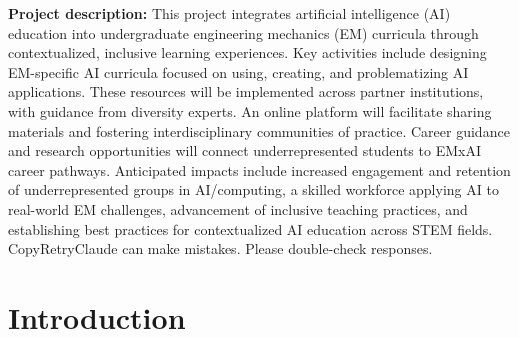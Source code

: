 \documentclass[11pt]{article}
\begin{document}
%
%
\pagestyle{plain} %
%
%
\setlength{\baselineskip}{12.6pt} %
\setlength{\normalbaselineskip}{12.6pt} %


\begin{tcolorbox}[colback=mycmykcolor, colframe=black, boxrule=1pt, coltext=black]
\textbf{Project description:} 
This project integrates artificial intelligence (AI) education into undergraduate engineering mechanics (EM) curricula through contextualized, inclusive learning experiences. Key activities include designing EM-specific AI curricula focused on using, creating, and problematizing AI applications. These resources will be implemented across partner institutions, with guidance from diversity experts. An online platform will facilitate sharing materials and fostering interdisciplinary communities of practice. Career guidance and research opportunities will connect underrepresented students to EMxAI career pathways. Anticipated impacts include increased engagement and retention of underrepresented groups in AI/computing, a skilled workforce applying AI to real-world EM challenges, advancement of inclusive teaching practices, and establishing best practices for contextualized AI education across STEM fields. CopyRetryClaude can make mistakes. Please double-check responses.
\end{tcolorbox}






\section{Introduction}
\end{document}
